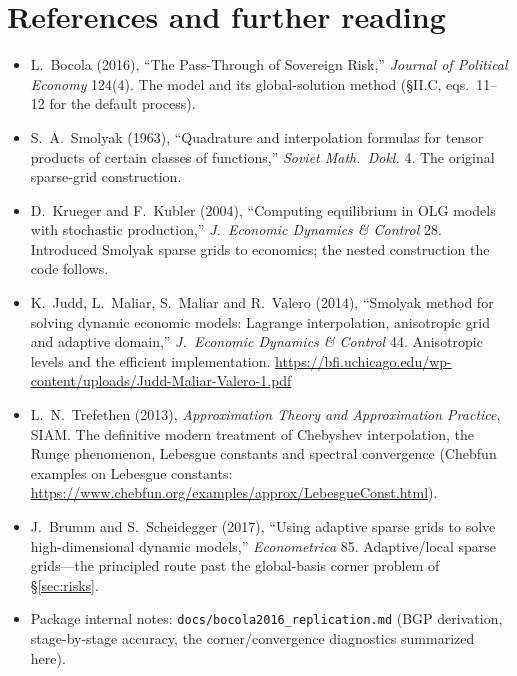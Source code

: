 \documentclass[11pt]{article}
\newcommand{\code}[1]{\texttt{#1}}
\begin{document}
\section*{References and further reading}
\small
\begin{itemize}
\item L.\ Bocola (2016), ``The Pass-Through of Sovereign Risk,''
      \emph{Journal of Political Economy} 124(4). The model and its
      global-solution method (\S II.C, eqs.\ 11--12 for the default
      process).
\item S.\ A.\ Smolyak (1963), ``Quadrature and interpolation formulas for
      tensor products of certain classes of functions,'' \emph{Soviet Math.\
      Dokl.} 4. The original sparse-grid construction.
\item D.\ Krueger and F.\ Kubler (2004), ``Computing equilibrium in OLG
      models with stochastic production,'' \emph{J.\ Economic Dynamics \&
      Control} 28. Introduced Smolyak sparse grids to economics; the nested
      construction the code follows.
\item K.\ Judd, L.\ Maliar, S.\ Maliar and R.\ Valero (2014), ``Smolyak
      method for solving dynamic economic models: Lagrange interpolation,
      anisotropic grid and adaptive domain,'' \emph{J.\ Economic Dynamics \&
      Control} 44. Anisotropic levels and the efficient implementation.
      \url{https://bfi.uchicago.edu/wp-content/uploads/Judd-Maliar-Valero-1.pdf}
\item L.\ N.\ Trefethen (2013), \emph{Approximation Theory and Approximation
      Practice}, SIAM. The definitive modern treatment of Chebyshev
      interpolation, the Runge phenomenon, Lebesgue constants and spectral
      convergence (Chebfun examples on Lebesgue constants:
      \url{https://www.chebfun.org/examples/approx/LebesgueConst.html}).
\item J.\ Brumm and S.\ Scheidegger (2017), ``Using adaptive sparse grids to
      solve high-dimensional dynamic models,'' \emph{Econometrica} 85.
      Adaptive/local sparse grids---the principled route past the
      global-basis corner problem of \S\ref{sec:risks}.
\item Package internal notes: \code{docs/bocola2016\_replication.md} (BGP
      derivation, stage-by-stage accuracy, the corner/convergence
      diagnostics summarized here).
\end{itemize}
\end{document}
